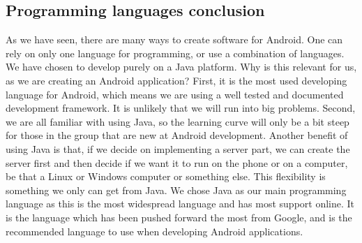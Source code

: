 \subsection{Programming languages conclusion}
As we have seen, there are many ways to create software for Android. One can rely on only one language for programming, or use a combination of languages. We have chosen to develop purely on a Java platform. Why is this relevant for us, as we are creating an Android application?
\newline
\newline
First, it is the most used developing language for Android, which means we are using a well tested and documented development framework. It is unlikely that we will run into big problems. Second, we are all familiar with using Java, so the learning curve will only be a bit steep for those in the group that are new at Android development.  Another benefit of using Java is that, if we decide on implementing a server part, we can create the server first and then decide if we want it to run on the phone or on a computer, be that a Linux or Windows computer or something else. This flexibility is something we only can get from Java.
\newline
\newline
We chose Java as our main programming language as this is the most widespread language and has most support online. It is the language which has been pushed forward the most from Google, and is the recommended language to use when developing Android applications.





